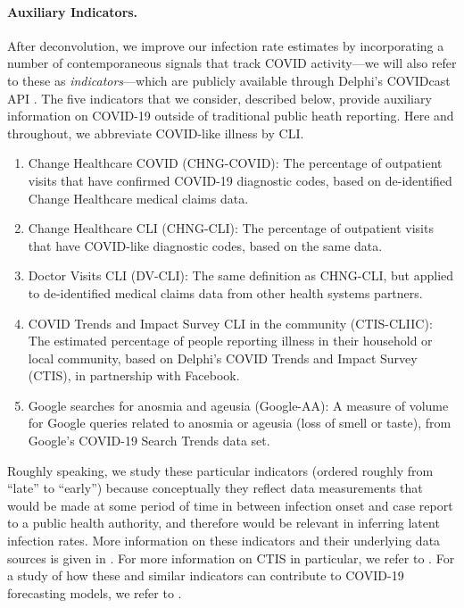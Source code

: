 \documentclass[sts]{imsart}
\theoremstyle{plain}
\theoremstyle{definition}
\theoremstyle{remark}
\begin{document}
\smallskip
\paragraph*{Auxiliary Indicators.}

After deconvolution, we improve our infection rate estimates by incorporating a
number of contemporaneous signals that track COVID activity---we will also 
refer to these as \emph{indicators}---which are publicly available through
Delphi's COVIDcast API \citep{Reinhart:2021}. The five indicators that we
consider, described below, provide auxiliary information on COVID-19 outside of 
traditional public heath reporting. Here and throughout, we abbreviate
COVID-like illness by CLI. 

\begin{enumerate}
\item Change Healthcare COVID (CHNG-COVID): The percentage of outpatient
  visits that have confirmed COVID-19 diagnostic codes, based on de-identified 
  Change Healthcare medical claims data. 
\item Change Healthcare CLI (CHNG-CLI): The percentage of outpatient visits that
  have COVID-like diagnostic codes, based on the same data.
\item Doctor Visits CLI (DV-CLI): The same definition as CHNG-CLI, but applied
  to de-identified medical claims data from other health systems partners. 
\item COVID Trends and Impact Survey CLI in the community
  (CTIS-CLIIC): The estimated percentage of people reporting  
  illness in their household or local community, based on Delphi's COVID
  Trends and Impact Survey (CTIS), in partnership with Facebook. 
\item Google searches for anosmia and ageusia (Google-AA): A measure of volume
  for Google queries related to anosmia or ageusia (loss of smell or taste),
  from Google's COVID-19 Search Trends data set. 
\end{enumerate}

Roughly speaking, we study these particular indicators (ordered roughly from
``late'' to  ``early'') because conceptually they reflect data measurements
that would be made at some period of time in between infection onset and case
report to a public health authority, and therefore would be relevant in
inferring latent infection rates. More information on these indicators and
their underlying data sources is given in \citet{Reinhart:2021}. For more
information on CTIS in particular, we refer to \citet{Salomon:2021}. For a
study of how these and similar indicators can contribute to COVID-19 forecasting
models, we refer to \citet{McDonald:2021}. 
\end{document}
